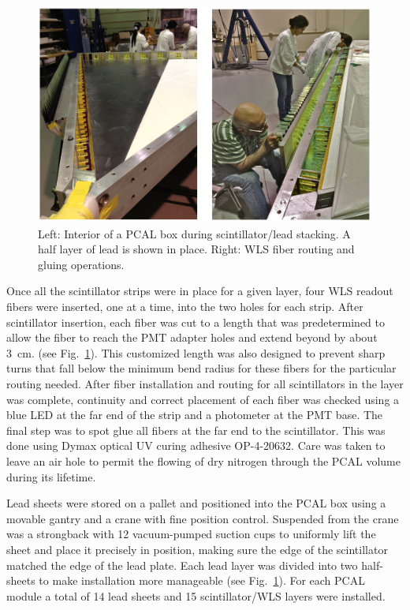 \begin{figure}[hbt]
\centering
\includegraphics[width=0.95\columnwidth,keepaspectratio]{img/S5_2.png}
\caption{Left: Interior of a PCAL box during scintillator/lead stacking. A half layer of lead is shown in place.
  Right: WLS fiber routing and gluing operations.}
\label{fig:S5_2}
\end{figure}

Once all the scintillator strips were in place for a given layer, four WLS readout fibers were inserted, one at a
time, into the two holes for each strip. After scintillator insertion, each fiber was cut to a length that was
predetermined to allow the fiber to reach the PMT adapter holes and extend beyond by about 3~cm.
(see Fig.~\ref{fig:S5_2}). This customized length was also designed to prevent sharp turns that fall below the
minimum bend radius for these fibers for the particular routing needed. After fiber installation and routing
for all scintillators in the layer was complete, continuity and correct placement of each fiber was checked using
a blue LED at the far end of the strip and a photometer at the PMT base. The final step was to spot glue all
fibers at the far end to the scintillator. This was done using Dymax optical UV curing adhesive OP-4-20632.
Care was taken to leave an air hole to permit the flowing of dry nitrogen through the PCAL volume during its
lifetime. 

Lead sheets were stored on a pallet and positioned into the PCAL box using a movable gantry and a crane with fine
position control. Suspended from the crane was a strongback with 12 vacuum-pumped suction cups to uniformly
lift the sheet and place it precisely in position, making sure the edge of the scintillator matched the edge of the
lead plate. Each lead layer was divided into two half-sheets to make installation more manageable (see
Fig.~\ref{fig:S5_2}). For each PCAL module a total of 14 lead sheets and 15 scintillator/WLS layers were
installed.

